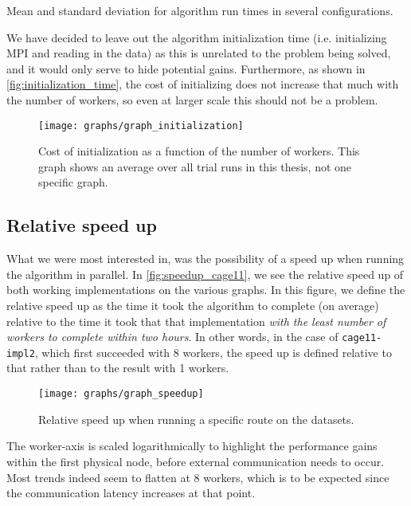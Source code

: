 \begin{table}
    \centering
    
    \caption{Mean and standard deviation for algorithm run times in several configurations.}
    \label{tab:algorithm-runtime}
\end{table}

We have decided to leave out the algorithm initialization time (i.e. initializing MPI and reading in the data) as this is unrelated to the problem being solved, and it would only serve to hide potential gains. Furthermore, as shown in \autoref{fig:initialization_time}, the cost of initializing does not increase that much with the number of workers, so even at larger scale this should not be a problem.

\begin{figure}
	\texttt{[image: graphs/graph\_initialization]}
  \caption{Cost of initialization as a function of the number of workers. This graph shows an average over all trial runs in this thesis, not one specific graph.}
  \label{fig:initialization_time}
\end{figure}

\subsection{Relative speed up}
What we were most interested in, was the possibility of a speed up when running the algorithm in parallel. In \autoref{fig:speedup_cage11}, we see the relative speed up of both working implementations on the various graphs. In this figure, we define the relative speed up as the time it took the algorithm to complete (on average) relative to the time it took that that implementation \emph{with the least number of workers to complete within two hours}. In other words, in the case of \texttt{cage11-impl2}, which first succeeded with 8 workers, the speed up is defined relative to that rather than to the result with 1 workers.

\begin{figure}
  \texttt{[image: graphs/graph\_speedup]}
  \caption{Relative speed up when running a specific route on the datasets.}
  \label{fig:speedup_cage11}
\end{figure}

The worker-axis is scaled logarithmically to highlight the performance gains within the first physical node, before external communication needs to occur. Most trends indeed seem to flatten at 8 workers, which is to be expected since the communication latency increases at that point.

